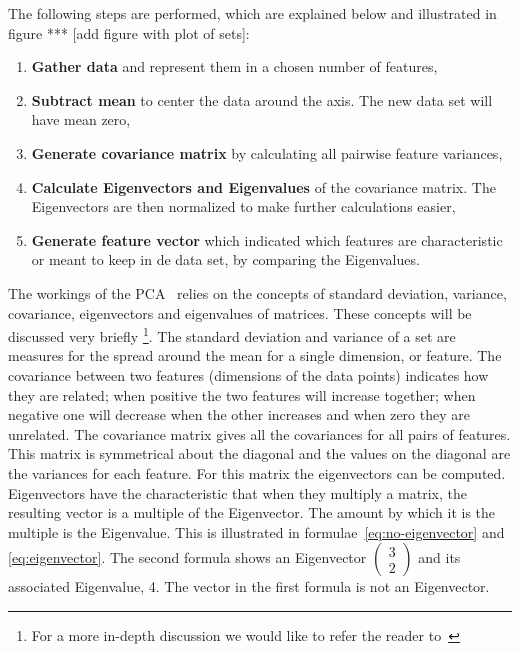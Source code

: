 The following steps are performed, which are explained below and illustrated in figure *** [add figure with plot of sets]:

\begin{enumerate}
	\item \textbf{Gather data} and represent them in a chosen number of features,
	\item \textbf{Subtract mean} to center the data around the axis. The new data set will have mean zero,
	\item \textbf{Generate covariance matrix} by calculating all pairwise feature variances,
	\item \textbf{Calculate Eigenvectors and Eigenvalues} of the covariance matrix.
	The Eigenvectors are then normalized to make further calculations easier,
	\item \textbf{Generate feature vector} which indicated which features are characteristic or meant to keep in de data set, by comparing the Eigenvalues.
\end{enumerate}

The workings of the PCA~\cite{smith2002tutorial} relies on the concepts of standard deviation, variance, covariance, eigenvectors and eigenvalues of matrices.
These concepts will be discussed very briefly \footnote{For a more in-depth discussion we would like to refer the reader to~\cite{jolliffe2005principal}}.
The standard deviation and variance of a set are measures for the spread around the mean for a single dimension, or feature.
The covariance between two features (dimensions of the data points) indicates how they are related; when positive the two features will increase together; when negative one will decrease when the other increases and when zero they are unrelated.
The covariance matrix gives all the covariances for all pairs of features.
This matrix is symmetrical about the diagonal and the values on the diagonal are the variances for each feature.
For this matrix the eigenvectors can be computed. Eigenvectors have the characteristic that when they multiply a matrix, the resulting vector is a multiple of the Eigenvector.
The amount by which it is the multiple is the Eigenvalue.
This is illustrated in formulae~\ref{eq:no-eigenvector} and \ref{eq:eigenvector}.
The second formula shows an Eigenvector $ \left( \begin{smallmatrix} 3 \\ 2 \end{smallmatrix} \right)$ and its associated Eigenvalue, 4.
The vector in the first formula is not an Eigenvector.

